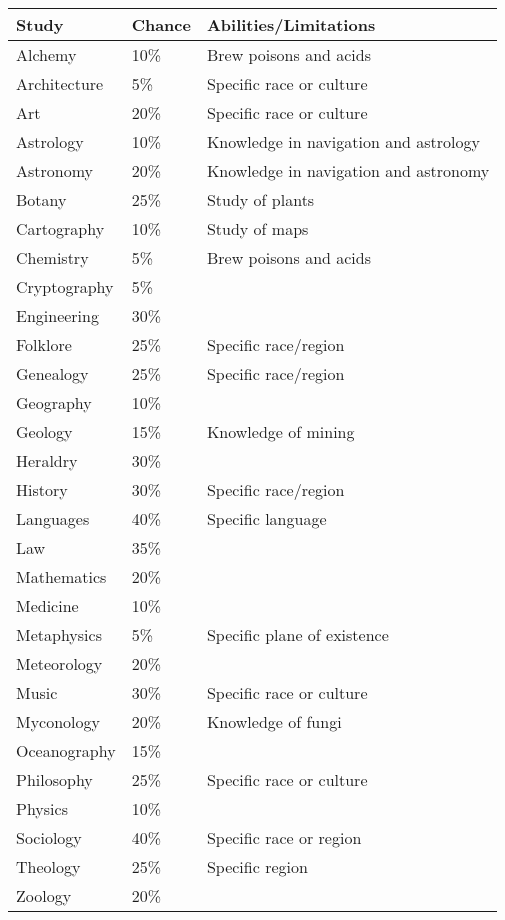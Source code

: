 \begin{multicols}{2}
\noindent
\begin{minipage}{\columnwidth}

\label{sageknowledge}
\noindent
\begin{tabular}{|p{}|p{}|p{}|}
\hline
Study			& Chance	& Abilities/Limitations \\
\hline\hline
\rowcolor[gray]{.9}Alchemy			& 10\%	& Brew poisons and acids \\
Architecture	& 5\%	& Specific race or culture \\
\rowcolor[gray]{.9}Art				& 20\%	& Specific race or culture \\
Astrology		& 10\%	& Knowledge in navigation and astrology \\
\rowcolor[gray]{.9}Astronomy		& 20\%	& Knowledge in navigation and astronomy \\
Botany			& 25\%	& Study of plants \\
\rowcolor[gray]{.9}Cartography		& 10\%	& Study of maps \\
Chemistry		& 5\%	& Brew poisons and acids \\
\rowcolor[gray]{.9}Cryptography	& 5\%	&  \\
Engineering		& 30\%	&  \\
\rowcolor[gray]{.9}Folklore		& 25\%	& Specific race/region \\
Genealogy		& 25\%	& Specific race/region \\
\rowcolor[gray]{.9}Geography		& 10\%	&  \\
Geology			& 15\%	& Knowledge of mining \\
\rowcolor[gray]{.9}Heraldry		& 30\%	&  \\
History			& 30\%	& Specific race/region \\
\rowcolor[gray]{.9}Languages		& 40\%	& Specific language \\
Law				& 35\%	&  \\
\rowcolor[gray]{.9}Mathematics		& 20\%	&  \\
Medicine		& 10\%	&  \\
\rowcolor[gray]{.9}Metaphysics		& 5\%	& Specific plane of existence \\
Meteorology		& 20\%	&  \\
\rowcolor[gray]{.9}Music			& 30\%	& Specific race or culture \\
Myconology		& 20\%	& Knowledge of fungi \\
\rowcolor[gray]{.9}Oceanography	& 15\%	&  \\
Philosophy		& 25\%	& Specific race or culture \\
\rowcolor[gray]{.9}Physics			& 10\%	&  \\
Sociology		& 40\%	& Specific race or region \\
\rowcolor[gray]{.9}Theology		& 25\%	& Specific region \\
Zoology			& 20\%	&  \\
\hline
\end{tabular}


\end{minipage}
\end{multicols}
